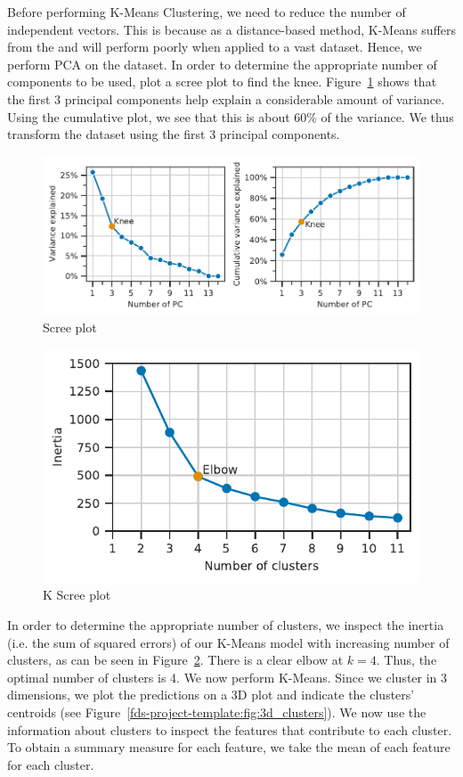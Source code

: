 \documentclass[11pt,a4paper]{article}
\begin{document}
Before performing K-Means Clustering, we need to reduce the number of independent vectors. This is because as a distance-based method, K-Means suffers from the  and will perform poorly when applied to a vast dataset. Hence, we perform PCA on the dataset. In order to determine the appropriate number of components to be used, plot a scree plot to find the knee. Figure~\ref{fds-project-template:fig:scree_plot} shows that the first 3 principal components help explain a considerable amount of variance. Using the cumulative plot, we see that this is about $60\%$ of the variance. We thus transform the dataset using the first 3 principal components.
\begin{figure} [h!]
  \centering
  \includegraphics{report/scree_plot.pdf}
  \caption{Scree plot}
  \label{fds-project-template:fig:scree_plot}
\end{figure}
\begin{figure} [h!]
  \centering
  \includegraphics{report/k_screeplot.pdf}
  \caption{K Scree plot}
  \label{fds-project-template:fig:k_screeplot}
\end{figure}
In order to determine the appropriate number of clusters, we inspect the inertia (i.e. the sum of squared errors) of our K-Means model with increasing number of clusters, as can be seen in Figure~\ref{fds-project-template:fig:k_screeplot}. There is a clear elbow at $k = 4$. Thus, the optimal number of clusters is 4. We now perform K-Means. Since we cluster in 3 dimensions, we plot the predictions on a 3D plot and indicate the clusters' centroids (see Figure~\ref{fds-project-template:fig:3d_clusters}). We now use the information about clusters to inspect the features that contribute to each cluster. To obtain a summary measure for each feature, we take the mean of each feature for each cluster.
\end{document}
